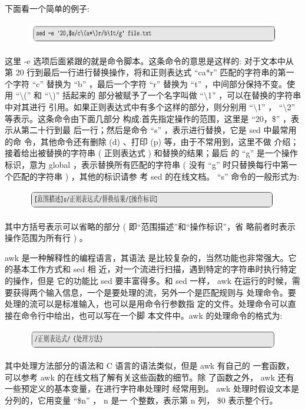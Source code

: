 \documentclass[12pt，a4paper]{article}
\numberwithin{equation}{section}
\begin{document}
下面看一个简单的例子:
\begin{figure}[H]
\centering
\includegraphics[scale=0.6]{./figures/281.png}
\end{figure}
这里 -e 选项后面紧跟的就是命令脚本。这条命令的意思是这样的:
对于文本中从第 20 行到最后一行进行替换操作，将和正则表达式
“ca*r” 匹配的字符串的第一个字符 “c” 替换为 “b” ，最后一个字符
“r” 替换为 “t” ，中间部分保持不变。使用 “$\setminus$(” 和 “$\setminus$)” 括起来的
部分被赋予了一个名字叫做 “$\setminus$1” ，可以在替换的字符串中对其进行
引用。如果正则表达式中有多个这样的部分，则分别用 “$\setminus$1” ， “$\setminus$2”
等表示。这条命令由下面几部分
构成:首先指定操作的范围，这里是 “20，\$” ，表示从第二十行到最
后一行；然后是命令 “s” ，表示进行替换，它是 sed 中最常用的命
令，其他命令还有删除 (d) 、打印 (p) 等，由于不常用到，这里不做
介绍；接着给出被替换的字符串 ( 正则表达式 ) 和替换的结果；最后
的 “g” 是一个操作标识，意为 global ，表示替换所有匹配的字符串
( 没有 “g” 时只替换每行中第一个匹配的字符串 ) ，其他的标识请参
考 sed 的在线文档。 “s” 命令的一般形式为:
\begin{figure}[H]
\centering
\includegraphics[scale=0.6]{./figures/282.png}
\end{figure}
其中方括号表示可以省略的部分 ( 即“范围描述”和“操作标识”，省
略前者时表示操作范围为所有行 ) 。

awk 是一种解释性的编程语言，其语法
是比较复杂的，当然功能也非常强大。它的基本工作方式和 sed 相
近，对一个流进行扫描，遇到特定的字符串时执行特定的操作，但是
它的功能比 sed 要丰富得多。和 sed 一样， awk 在运行的时候，需
要获得两个输入信息，一个是要处理的流，另外一个是匹配规则与
处理命令。要处理的流可以是标准输入，也可以是用命令行参数指
定的文件。处理命令可以直接在命令行中给出，也可以写在一个脚
本文件中。awk 的处理命令的格式为:
\begin{figure}[H]
\centering
\includegraphics[scale=0.6]{./figures/283.png}
\end{figure}
其中处理方法部分的语法和 C 语言的语法类似，但是 awk 有自己的
一套函数，可以参考 awk 的在线文档了解有关这些函数的细节。除
了函数之外， awk 还有一些预定义的基本变量，在进行字符串处理时
经常用到。 awk 处理时假设文本是分列的，它用变量 “\$n” ， n 是一
个整数，表示第 n 列， \$0 表示整个行。
\end{document}
